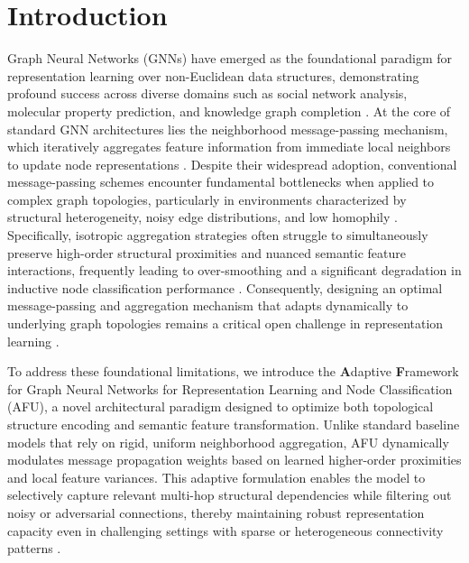 \documentclass[10pt,twocolumn]{article}
\begin{document}
\section{Introduction}
Graph Neural Networks (GNNs) have emerged as the foundational paradigm for representation learning over non-Euclidean data structures, demonstrating profound success across diverse domains such as social network analysis, molecular property prediction, and knowledge graph completion \cite{target_ref, ref_1, ref_6}. At the core of standard GNN architectures lies the neighborhood message-passing mechanism, which iteratively aggregates feature information from immediate local neighbors to update node representations \cite{ref_3, ref_17}. Despite their widespread adoption, conventional message-passing schemes encounter fundamental bottlenecks when applied to complex graph topologies, particularly in environments characterized by structural heterogeneity, noisy edge distributions, and low homophily \cite{ref_5, ref_37}. Specifically, isotropic aggregation strategies often struggle to simultaneously preserve high-order structural proximities and nuanced semantic feature interactions, frequently leading to over-smoothing and a significant degradation in inductive node classification performance \cite{ref_2, ref_20}. Consequently, designing an optimal message-passing and aggregation mechanism that adapts dynamically to underlying graph topologies remains a critical open challenge in representation learning \cite{ref_22, ref_23}.

To address these foundational limitations, we introduce the \textbf{A}daptive \textbf{F}ramework for Graph Neural Networks for Representation Learning and Node Classification (\textsc{AFU}), a novel architectural paradigm designed to optimize both topological structure encoding and semantic feature transformation. Unlike standard baseline models that rely on rigid, uniform neighborhood aggregation, \textsc{AFU} dynamically modulates message propagation weights based on learned higher-order proximities and local feature variances. This adaptive formulation enables the model to selectively capture relevant multi-hop structural dependencies while filtering out noisy or adversarial connections, thereby maintaining robust representation capacity even in challenging settings with sparse or heterogeneous connectivity patterns \cite{ref_26, ref_36}.
\end{document}
